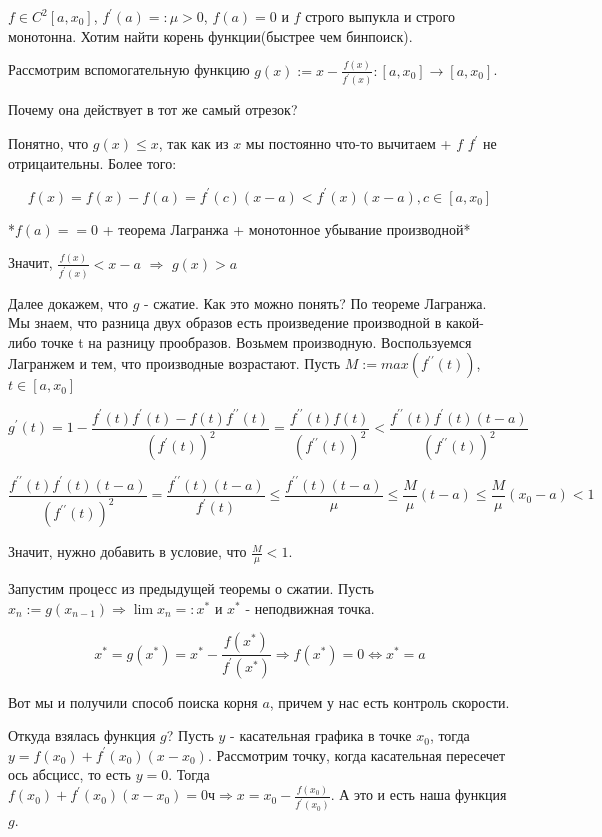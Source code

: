 \begin{example} \thmslashn
	
	$f \in C^2[a, x_0]$, $f^\prime(a) =: \mu > 0$, $f(a) = 0$ и $f$ строго выпукла и строго монотонна. Хотим найти корень функции(быстрее чем бинпоиск).
	
	Рассмотрим вспомогательную функцию $g(x) := x - \frac{f(x)}{f^\prime(x)} : [a, x_0] \rightarrow [a, x_0]$.
	
	Почему она действует в тот же самый отрезок?
	
	Понятно, что $g(x) \leq x$, так как из $x$ мы постоянно что-то вычитаем + $f$ $f^\prime$ не отрицаительны. Более того:
	
	$$
	f(x) = f(x) - f(a) = f^\prime(c)(x - a) < f^\prime(x)(x - a), c \in [a, x_0]
	$$
	
	*$f(a) == 0$ + теорема Лагранжа + монотонное убывание производной*
	
	Значит, $\frac{f(x)}{f^\prime(x)} < x - a$ $\Rightarrow$ $g(x) > a$
	
	Далее докажем, что $g$ - сжатие. Как это можно понять? По теореме Лагранжа. Мы знаем, что разница двух образов есть произведение производной в какой-либо точке t на разницу прообразов. Возьмем производную. Воспользуемся Лагранжем и тем, что производные возрастают. Пусть $M := max(f^{\prime\prime}(t))$, $t \in [a, x_0]$
	
	
	$$
	g^\prime(t) = 
	1 - \frac{f^\prime(t)f^\prime(t) - f(t) f^{\prime\prime}(t)}{(f^\prime(t))^2}
	=
	\frac{f^{\prime\prime}(t) f(t)}{(f^{\prime\prime}(t))^2} 
	<
	\frac{f^{\prime\prime}(t) f^\prime(t)(t  - a)}{(f^{\prime\prime}(t))^2}
	$$
	
	$$
	\frac{f^{\prime\prime}(t) f^\prime(t)(t  - a)}{(f^{\prime\prime}(t))^2}
	=
	\frac{f^{\prime\prime}(t)(t-a)}{f^{\prime}(t)} \leq
	\frac{f^{\prime\prime}(t)(t-a)}{\mu}
	\leq
	\frac{M}{\mu}(t-a)
	\leq
	\frac{M}{\mu}(x_0-a)
	< 1
	$$
	
	Значит, нужно добавить в условие, что $\frac{M}{\mu} < 1$.
	
	Запустим процесс из предыдущей теоремы о сжатии. Пусть $x_n := g(x_{n - 1}) \Rightarrow \lim x_n = :x^*$ и $x^*$ - неподвижная точка.
	
	$$
	x^* = g(x^*) = x^* - \frac{f(x^*)}{f^\prime(x^*)} \Rightarrow f(x^*) = 0 \iff x^* = a
	$$
	
	Вот мы и получили способ поиска корня $a$, причем у нас есть контроль скорости.
	
\end{example}

\begin{remark} \thmslashn
	
	Откуда взялась функция $g$? Пусть $y$ - касательная графика в точке $x_0$, тогда $y = f(x_0) + f^\prime(x_0)(x - x_0)$. Рассмотрим точку, когда касательная пересечет ось абсцисс, то есть $y = 0$. Тогда  $f(x_0) + f^\prime(x_0)(x - x_0) = 0ч	 \Rightarrow x = x_0 - \frac{f(x_0)}{f^\prime(x_0)}$. А это и есть наша функция $g$.
\end{remark}
